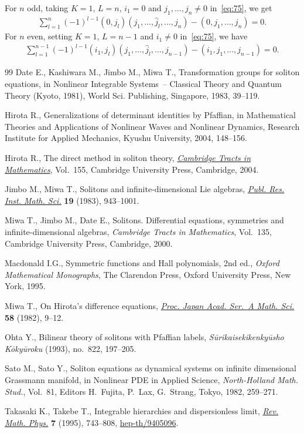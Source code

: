 \documentclass[11pt]{article}
\begin{document}
For $n$ odd, taking $K=1$, $L=n$, $i_1=0$ and $j_1,\dots,j_n\neq0$ in~\eqref{eq:75}, we get
\begin{gather}
\sum_{l=1}^n(-1)^{l-1}(0,j_l)(j_1,\dots,\hat{j}_l,\dots,j_n)-(0,j_1,\dots,j_n)=0.
\label{eq:500}
\end{gather}
For $n$ even, setting $K=1$, $L=n-1$ and $i_1\neq0$ in~\eqref{eq:75}, we have
\begin{gather}
\sum_{l=1}^{n-1}(-1)^{l-1}(i_1,j_l)(j_1,\dots,\hat{j}_l,\dots,j_{n-1})-(i_1,j_1,\dots,j_{n-1})=0.
\label{eq:501}
\end{gather}
\begin{thebibliography}{99}
Date E., Kashiwara M., Jimbo M., Miwa T., Transformation groups for soliton
  equations, in Nonlinear In\-tegrable Systems~-- Classical Theory and Quantum
  Theory ({K}yoto, 1981), World Sci. Publishing, Singapore, 1983, 39--119.

Hirota R., Generalizations of determinant identities by Pfaf\/f\/ian, in
  Mathematical Theories and Applications of Nonlinear Waves and Nonlinear
  Dynamics, Research Institute for Applied Mechanics, Kyushu University, 2004, 148--156.

Hirota R., The direct method in soliton theory, \href{http://dx.doi.org/10.1017/CBO9780511543043}{\textit{Cambridge Tracts in
  Mathematics}}, Vol.~155, Cambridge University Press, Cambridge, 2004.


Jimbo M., Miwa T., Solitons and inf\/inite-dimensional {L}ie algebras,
  \href{http://dx.doi.org/10.2977/prims/1195182017}{\textit{Publ. Res. Inst. Math. Sci.}} \textbf{19} (1983), 943--1001.

Miwa T., Jimbo M., Date E.,
Solitons. Dif\/ferential equations, symmetries and inf\/inite-dimensional algebras,
\textit{Cambridge Tracts in Mathematics}, Vol.~135, Cambridge University Press, Cambridge, 2000.

Macdonald I.G., Symmetric functions and {H}all polynomials, 2nd ed., \textit{Oxford
  Mathematical Monographs}, The Clarendon Press, Oxford University Press, New
  York, 1995.

Miwa T., On {H}irota's dif\/ference equations, \href{http://dx.doi.org/10.3792/pjaa.58.9}{\textit{Proc. Japan Acad. Ser.~A
  Math. Sci.}} \textbf{58} (1982), 9--12.

Ohta Y., Bilinear theory of solitons with {P}faf\/f\/ian labels,
  \textit{S\=urikaisekikenky\=usho K\=oky\=uroku}  (1993), no.~822, 197--205.

Sato M., Sato Y., Soliton equations as dynamical systems on inf\/inite
  dimensional Grassmann manifold, in Nonlinear PDE in Applied Science,
  \textit{North-Holland Math. Stud.}, Vol.~81, Editors H.~Fujita, P.~Lax,
  G.~Strang, Tokyo, 1982, 259--271.

Takasaki K., Takebe T., Integrable hierarchies and dispersionless limit,
  \href{http://dx.doi.org/10.1142/S0129055X9500030X}{\textit{Rev. Math. Phys.}} \textbf{7} (1995), 743--808,
  \href{http://arxiv.org/abs/hep-th/9405096}{hep-th/9405096}.

\end{thebibliography}
\end{document}
